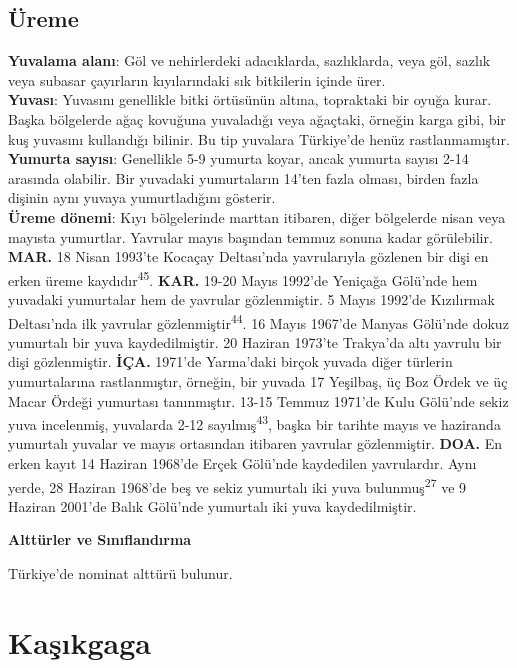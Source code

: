 \documentclass[
  letterpaper,
  DIV=11,
  numbers=noendperiod]{scrreprt}
\begin{document}
\hypertarget{uxfcreme-15}{%
\subsection{\texorpdfstring{\textbf{Üreme}}{Üreme}}\label{uxfcreme-15}}

\textbf{Yuvalama alanı}: Göl ve nehirlerdeki adacıklarda, sazlıklarda,
veya göl, sazlık veya subasar çayırların kıyılarındaki sık bitkilerin
içinde ürer.\\
\textbf{Yuvası}: Yuvasını genellikle bitki örtüsünün altına, topraktaki
bir oyuğa kurar. Başka bölgelerde ağaç kovuğuna yuvaladığı veya
ağaçtaki, örneğin karga gibi, bir kuş yuvasını kullandığı bilinir. Bu
tip yuvalara Türkiye'de henüz rastlanmamıştır.\\
\textbf{Yumurta sayısı}: Genellikle 5-9 yumurta koyar, ancak yumurta
sayısı 2-14 arasında olabilir. Bir yuvadaki yumurtaların 14'ten fazla
olması, birden fazla dişinin aynı yuvaya yumurtladığını gösterir.\\
\textbf{Üreme dönemi}: Kıyı bölgelerinde marttan itibaren, diğer
bölgelerde nisan veya mayısta yumurtlar. Yavrular mayıs başından temmuz
sonuna kadar görülebilir. \textbf{MAR.} 18 Nisan 1993'te Kocaçay
Deltası'nda yavrularıyla gözlenen bir dişi en erken üreme
kaydıdır\textsuperscript{45}. \textbf{KAR.} 19-20 Mayıs 1992'de Yeniçağa
Gölü'nde hem yuvadaki yumurtalar hem de yavrular gözlenmiştir. 5 Mayıs
1992'de Kızılırmak Deltası'nda ilk yavrular
gözlenmiştir\textsuperscript{44}. 16 Mayıs 1967'de Manyas Gölü'nde dokuz
yumurtalı bir yuva kaydedilmiştir. 20 Haziran 1973'te Trakya'da altı
yavrulu bir dişi gözlenmiştir. \textbf{İÇA.} 1971'de Yarma'daki birçok
yuvada diğer türlerin yumurtalarına rastlanmıştır, örneğin, bir yuvada
17 Yeşilbaş, üç Boz Ördek ve üç Macar Ördeği yumurtası tanınmıştır.
13-15 Temmuz 1971'de Kulu Gölü'nde sekiz yuva incelenmiş, yuvalarda 2-12
sayılmış\textsuperscript{43}, başka bir tarihte mayıs ve haziranda
yumurtalı yuvalar ve mayıs ortasından itibaren yavrular gözlenmiştir.
\textbf{DOA.} En erken kayıt 14 Haziran 1968'de Erçek Gölü'nde
kaydedilen yavrulardır. Aynı yerde, 28 Haziran 1968'de beş ve sekiz
yumurtalı iki yuva bulunmuş\textsuperscript{27} ve 9 Haziran 2001'de
Balık Gölü'nde yumurtalı iki yuva kaydedilmiştir.

\textbf{Alttürler ve Sınıflandırma}

Türkiye'de nominat alttürü bulunur.

\hypertarget{kaux15fux131kgaga}{%
\section{Kaşıkgaga}\label{kaux15fux131kgaga}}
\end{document}
